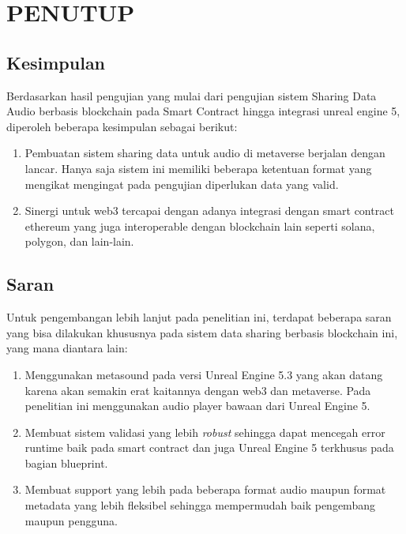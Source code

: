 \chapter{PENUTUP}
\label{chap:penutup}


\section{Kesimpulan}
\label{sec:kesimpulan}

Berdasarkan hasil pengujian yang mulai dari pengujian sistem Sharing Data Audio berbasis blockchain pada Smart Contract hingga integrasi unreal engine 5, diperoleh beberapa kesimpulan sebagai berikut:

\begin{enumerate}[nolistsep]

  \item Pembuatan sistem sharing data untuk audio di metaverse berjalan dengan lancar. Hanya saja sistem ini memiliki beberapa ketentuan format yang mengikat mengingat pada pengujian diperlukan data yang valid.

  \item Sinergi untuk web3 tercapai dengan adanya integrasi dengan smart contract ethereum yang juga interoperable dengan blockchain lain seperti solana, polygon, dan lain-lain.

\end{enumerate}

\section{Saran}
\label{chap:saran}

Untuk pengembangan lebih lanjut pada penelitian ini, terdapat beberapa saran yang bisa dilakukan khususnya pada sistem data sharing berbasis blockchain ini, yang mana diantara lain:

\begin{enumerate}[nolistsep]

  \item Menggunakan metasound pada versi Unreal Engine 5.3 yang akan datang karena akan semakin erat kaitannya dengan web3 dan metaverse. Pada penelitian ini menggunakan audio player bawaan dari Unreal Engine 5.

  \item Membuat sistem validasi yang lebih \emph{robust} sehingga dapat mencegah error runtime baik pada smart contract dan juga Unreal Engine 5 terkhusus pada bagian blueprint.

  \item Membuat support yang lebih pada beberapa format audio maupun format metadata yang lebih fleksibel sehingga mempermudah baik pengembang maupun pengguna.

\end{enumerate}
